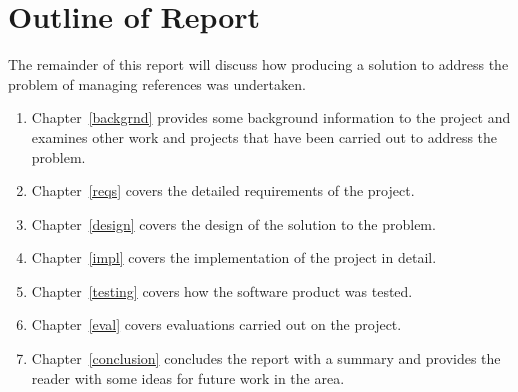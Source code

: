 
\section{Outline of Report}
The remainder of this report will discuss how producing a solution to address the problem of managing \bibtex{} references was undertaken. 
\begin{enumerate}
\item Chapter~\ref{backgrnd} provides some background information to the project and examines other work and projects that have been carried out to address the problem.
\item Chapter~\ref{reqs} covers the detailed requirements of the project.
\item Chapter~\ref{design} covers the design of the solution to the problem.
\item Chapter~\ref{impl} covers the implementation of the project in detail.
\item Chapter~\ref{testing} covers how the software product was tested.
\item Chapter~\ref{eval} covers evaluations carried out on the project.
\item Chapter~\ref{conclusion} concludes the report with a summary and provides the reader with some ideas for future work in the area.
\end{enumerate}